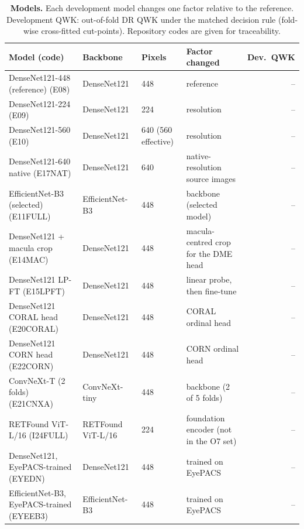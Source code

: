 \begin{table}[t]
\caption{\textbf{Models.} Each development model changes one factor relative
to the reference. Development QWK: out-of-fold DR QWK under the matched decision rule
(fold-wise cross-fitted cut-points). Repository codes are given for traceability.}\label{tab:models}
\centering\footnotesize\setlength{\tabcolsep}{3pt}
\begin{tabular}{@{}p{4.3cm}p{2.3cm}p{1.6cm}p{3.4cm}r@{}}
\toprule
Model (code) & Backbone & Pixels & Factor changed & Dev.\ QWK \\
\midrule
DenseNet121-448 (reference) (E08) & DenseNet121 & 448 & reference & -- \\
DenseNet121-224 (E09) & DenseNet121 & 224 & resolution & -- \\
DenseNet121-560 (E10) & DenseNet121 & 640 (560 effective) & resolution & -- \\
DenseNet121-640 native (E17NAT) & DenseNet121 & 640 & native-resolution source images & -- \\
EfficientNet-B3 (selected) (E11FULL) & EfficientNet-B3 & 448 & backbone (selected model) & -- \\
DenseNet121 + macula crop (E14MAC) & DenseNet121 & 448 & macula-centred crop for the DME head & -- \\
DenseNet121 LP-FT (E15LPFT) & DenseNet121 & 448 & linear probe, then fine-tune & -- \\
DenseNet121 CORAL head (E20CORAL) & DenseNet121 & 448 & CORAL ordinal head & -- \\
DenseNet121 CORN head (E22CORN) & DenseNet121 & 448 & CORN ordinal head & -- \\
ConvNeXt-T (2 folds) (E21CNXA) & ConvNeXt-tiny & 448 & backbone (2 of 5 folds) & -- \\
RETFound ViT-L/16 (I24FULL) & RETFound ViT-L/16 & 224 & foundation encoder (not in the O7 set) & -- \\
DenseNet121, EyePACS-trained (EYEDN) & DenseNet121 & 448 & trained on EyePACS & -- \\
EfficientNet-B3, EyePACS-trained (EYEEB3) & EfficientNet-B3 & 448 & trained on EyePACS & -- \\
\bottomrule
\end{tabular}
\end{table}
